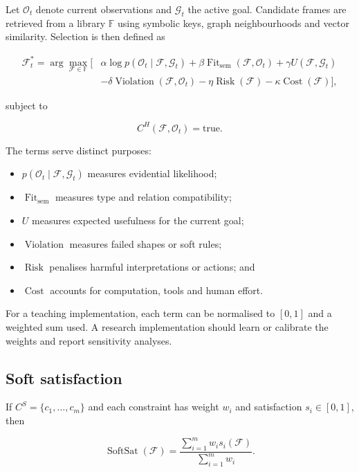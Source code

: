 \documentclass[11pt,a4paper]{article}
\newcommand{\Frame}{\mathcal{F}}
\newcommand{\Frames}{\mathbb{F}}
\newcommand{\Obs}{\mathcal{O}}
\newcommand{\Goals}{\mathcal{G}}
\newcommand{\Risk}{\operatorname{Risk}}
\newcommand{\Cost}{\operatorname{Cost}}
\newcommand{\Violation}{\operatorname{Violation}}
\newcommand{\Fit}{\operatorname{Fit}}
\begin{document}
Let $\Obs_t$ denote current observations and $\Goals_t$ the active goal. Candidate
frames are retrieved from a library $\Frames$ using symbolic keys, graph
neighbourhoods and vector similarity. Selection is then defined as

\begin{align}
\Frame_t^{*} = \arg\max_{\Frame\in\Frames}
\Big[&\alpha\log p(\Obs_t\mid\Frame,\Goals_t)
+\beta\Fit_{\mathrm{sem}}(\Frame,\Obs_t)
+\gamma U(\Frame,\Goals_t) \nonumber\\
&-\delta\Violation(\Frame,\Obs_t)
-\eta\Risk(\Frame)
-\kappa\Cost(\Frame)\Big],
\label{eq:selection}
\end{align}

subject to

\begin{equation}
C^H(\Frame,\Obs_t)=\mathrm{true}.
\label{eq:hard}
\end{equation}

The terms serve distinct purposes:

\begin{itemize}
  \item $p(\Obs_t\mid\Frame,\Goals_t)$ measures evidential likelihood;
  \item $\Fit_{\mathrm{sem}}$ measures type and relation compatibility;
  \item $U$ measures expected usefulness for the current goal;
  \item $\Violation$ measures failed shapes or soft rules;
  \item $\Risk$ penalises harmful interpretations or actions; and
  \item $\Cost$ accounts for computation, tools and human effort.
\end{itemize}

For a teaching implementation, each term can be normalised to $[0,1]$ and a
weighted sum used. A research implementation should learn or calibrate the
weights and report sensitivity analyses.

\subsection{Soft satisfaction}

If $C^S=\{c_1,\ldots,c_m\}$ and each constraint has weight $w_i$ and satisfaction
$s_i\in[0,1]$, then

\begin{equation}
\operatorname{SoftSat}(\Frame)=
\frac{\sum_{i=1}^{m}w_i s_i(\Frame)}{\sum_{i=1}^{m}w_i}.
\label{eq:soft}
\end{equation}
\end{document}
